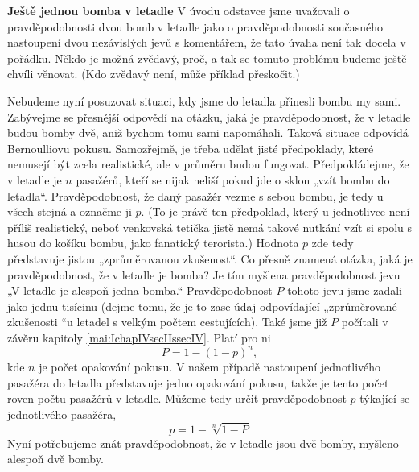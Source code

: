 \begin{mdframed}[style=mdexam]
  \begin{example}\label{mai:exam060}
    \textbf{Ještě jednou bomba v letadle}\newline
    V úvodu odstavce jsme uvažovali o pravděpodobnosti dvou bomb v letadle jako o pravděpodobnosti
    současného nastoupení dvou nezávislých jevů s komentářem, že tato úvaha není tak docela v
    pořádku. Někdo je možná zvědavý, proč, a tak se tomuto problému budeme ještě chvíli věnovat.
    (Kdo zvědavý není, může příklad přeskočit.)
    
    Nebudeme nyní posuzovat situaci, kdy jsme do letadla přinesli bombu my sami. Zabývejme se
    přesnější odpovědí na otázku, jaká je pravděpodobnost, že v letadle budou bomby dvě, aniž bychom
    tomu sami napomáhali. Taková situace odpovídá Bernoulliovu pokusu. Samozřejmě, je třeba udělat
    jisté předpoklady, které nemusejí být zcela realistické, ale v průměru budou fungovat.
    Předpokládejme, že v letadle je \(n\) pasažérů, kteří se nijak neliší pokud jde o sklon „vzít
    bombu do letadla“. Pravděpodobnost, že daný pasažér vezme s sebou bombu, je tedy u všech stejná
    a označme ji \(p\). (To je právě ten předpoklad, který u jednotlivce není příliš realistický,
    neboť venkovská tetička jistě nemá takové nutkání vzít si spolu s husou do košíku bombu, jako
    fanatický terorista.) Hodnota \(p\) zde tedy představuje jistou „zprůměrovanou zkušenost“. Co
    přesně znamená otázka, jaká je pravděpodobnost, že v letadle je bomba? Je tím myšlena
    pravděpodobnost jevu „V letadle je alespoň jedna bomba.“ Pravděpodobnost \(P\) tohoto jevu jsme
    zadali jako jednu tisícinu (dejme tomu, že je to zase údaj odpovídající „zprůměrované zkušenosti
    “u letadel s velkým počtem cestujících). Také jsme již \(P\) počítali v závěru kapitoly
    \ref{mai:IchapIVsecIIssecIV}. Platí pro ni
    \begin{equation*}
      P = 1 - (1 - p)^n,
    \end{equation*}
    kde \(n\) je počet opakování pokusu. V našem případě nastoupení jednotlivého pasažéra do letadla
    představuje jedno opakování pokusu, takže je tento počet roven počtu pasažérů v letadle. Můžeme
    tedy určit pravděpodobnost \(p\) týkající se jednotlivého pasažéra,
    \begin{equation*}
      p = 1 - \sqrt[n]{1 - P}
    \end{equation*}
    Nyní potřebujeme znát pravděpodobnost, že v letadle jsou dvě bomby, myšleno alespoň dvě bomby.

\end{example}
\end{mdframed}
